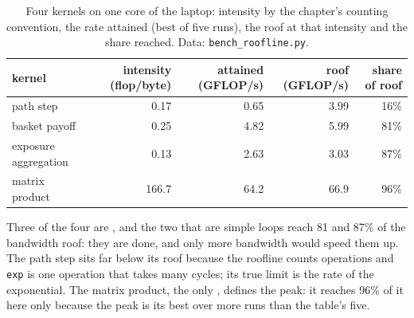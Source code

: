 \begin{table}[ht]
\centering\small
\begin{tabular}{lrrrr}
\toprule
kernel & intensity (flop/byte) & attained (GFLOP/s) & roof (GFLOP/s) & share of roof \\
\midrule
path step & 0.17 & 0.65 & 3.99 & 16\% \\
basket payoff & 0.25 & 4.82 & 5.99 & 81\% \\
exposure aggregation & 0.13 & 2.63 & 3.03 & 87\% \\
matrix product & 166.7 & 64.2 & 66.9 & 96\% \\
\bottomrule
\end{tabular}
\caption{Four kernels on one core of the laptop: intensity by the chapter's counting convention, the rate attained (best of five runs),
the roof at that intensity and the share reached. Data: \texttt{bench\_roofline.py}.}
\label{tab:pl:accelerators-for-quantitative-work:kernels}
\end{table}

Three of the four are , and the two that are simple loops reach 81 and 87\% of the bandwidth roof: they are done, and only more
bandwidth would speed them up. The path step sits far below its roof because the roofline counts operations and \texttt{exp} is one
operation that takes many cycles; its true limit is the rate of the exponential. The matrix product, the only , defines
the peak: it reaches 96\% of it here only because the peak is its best over more runs than the table's five.

